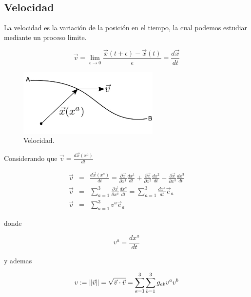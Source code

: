 \documentclass[12pt]{report}
\DeclarePairedDelimiter\norm{\lVert}{\rVert}
\begin{document}
\subsection{Velocidad}

 
La velocidad es la variación de la posición en el tiempo, la cual podemos estudiar mediante un proceso limite.


\begin{equation} \label{2.92}
\vec{v}=\lim_{\epsilon \to 0} \frac{\vec{x}(t+\epsilon)-\vec{x}(t)}{\epsilon}=\frac{d\vec{x}}{dt}
\end{equation}


\begin{figure}[H]
	\begin{center}
	\includegraphics[width=7cm]{figura101.png}
	\caption{ Velocidad.}
	\label{fig.1}
	\end{center}
\end{figure}



Considerando que $\displaystyle\vec{v}=\frac{d\vec{x}(x^a)}{dt}$

\begin{eqnarray} \nonumber
\vec{v} &=& \frac{d\vec{x}(x^a)}{dt} = \frac{\partial \vec{x}}{\partial x^1}\frac{dx^1}{dt} + \frac{\partial \vec{x}}{\partial x^2}\frac{dx^2}{dt} + \frac{\partial \vec{x}}{\partial x^3}\frac{dx^3}{dt} \\ \nonumber
\vec{v} &=& \sum_{a=1}^3 \frac{\partial \vec{x}}{\partial x^a}\frac{dx^a}{dt} = \sum_{a=1}^3\frac{dx^a}{dt} \vec{e}_a \\ \nonumber
\vec{v} &=& \sum_{a=1}^3 v^a \vec{e}_a  
\end{eqnarray}

donde

\begin{equation} \label{2.93}
v^a=\frac{dx^a}{dt}
\end{equation}

y ademas

\begin{equation} \label{2.94}
v := \norm{\vec{v}} = \sqrt{\vec{v}\cdot \vec{v}} = \sum_{a=1}^3\sum_{b=1}^3 g_{ab}v^av^b
\end{equation}
\end{document}
